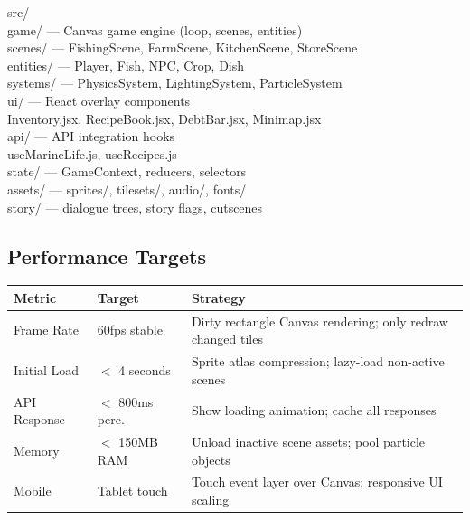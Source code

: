 \documentclass[11pt, letterpaper]{article}
\newcommand{\altrow}{\rowcolor{rowalt}}
\begin{document}
\begin{codebox}
src/\\
  game/           --- Canvas game engine (loop, scenes, entities)\\
    scenes/       --- FishingScene, FarmScene, KitchenScene, StoreScene\\
    entities/     --- Player, Fish, NPC, Crop, Dish\\
    systems/      --- PhysicsSystem, LightingSystem, ParticleSystem\\
  ui/             --- React overlay components\\
    Inventory.jsx, RecipeBook.jsx, DebtBar.jsx, Minimap.jsx\\
  api/            --- API integration hooks\\
    useMarineLife.js, useRecipes.js\\
  state/          --- GameContext, reducers, selectors\\
  assets/         --- sprites/, tilesets/, audio/, fonts/\\
  story/          --- dialogue trees, story flags, cutscenes
\end{codebox}

\subsection{Performance Targets}

\vspace{4pt}
\begin{tabularx}{\textwidth}{L{3.2cm} L{2.4cm} X}
\toprule
{}
\textbf{\color{white}Metric} & \textbf{\color{white}Target} & \textbf{\color{white}Strategy} \\
\midrule
Frame Rate        & 60fps stable   & Dirty rectangle Canvas rendering; only redraw changed tiles \\
\altrow
Initial Load      & $<$ 4 seconds  & Sprite atlas compression; lazy-load non-active scenes \\
API Response      & $<$ 800ms perc.& Show loading animation; cache all responses \\
\altrow
Memory            & $<$ 150MB RAM  & Unload inactive scene assets; pool particle objects \\
Mobile            & Tablet touch   & Touch event layer over Canvas; responsive UI scaling \\
\bottomrule
\end{tabularx}

\newpage
\end{document}
